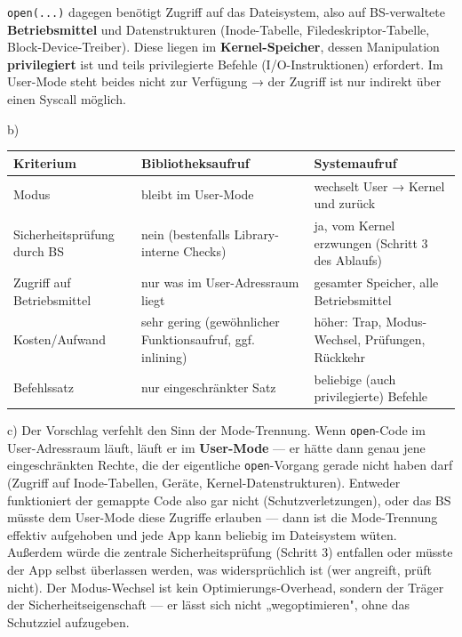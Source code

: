 \documentclass[11pt, a4paper]{article}
\begin{document}
\texttt{open(...)} dagegen benötigt Zugriff auf das Dateisystem, also auf BS-verwaltete \textbf{Betriebsmittel} und Datenstrukturen (Inode-Tabelle, Filedeskriptor-Tabelle, Block-Device-Treiber). Diese liegen im \textbf{Kernel-Speicher}, dessen Manipulation \textbf{privilegiert} ist und teils privilegierte Befehle (I/O-Instruktionen) erfordert. Im User-Mode steht beides nicht zur Verfügung → der Zugriff ist nur indirekt über einen Syscall möglich.


b)



{\small
\begin{tabularx}{\linewidth}{XXX}
\hline
\rowcolor{tableheadbg}
{\color{white}\textbf{Kriterium}} & {\color{white}\textbf{Bibliotheksaufruf}} & {\color{white}\textbf{Systemaufruf}} \\[2pt]
\hline
\endhead
\hline
\endfoot
Modus & bleibt im User-Mode & wechselt User → Kernel und zurück \\
Sicherheitsprüfung durch BS & nein (bestenfalls Library-interne Checks) & ja, vom Kernel erzwungen (Schritt 3 des Ablaufs) \\
Zugriff auf Betriebsmittel & nur was im User-Adressraum liegt & gesamter Speicher, alle Betriebsmittel \\
Kosten/Aufwand & sehr gering (gewöhnlicher Funktionsaufruf, ggf. inlining) & höher: Trap, Modus-Wechsel, Prüfungen, Rückkehr \\
Befehlssatz & nur eingeschränkter Satz & beliebige (auch privilegierte) Befehle \\
\end{tabularx}
}


c) Der Vorschlag verfehlt den Sinn der Mode-Trennung. Wenn \texttt{open}-Code im User-Adressraum läuft, läuft er im \textbf{User-Mode} — er hätte dann genau jene eingeschränkten Rechte, die der eigentliche \texttt{open}-Vorgang gerade nicht haben darf (Zugriff auf Inode-Tabellen, Geräte, Kernel-Datenstrukturen). Entweder funktioniert der gemappte Code also gar nicht (Schutzverletzungen), oder das BS müsste dem User-Mode diese Zugriffe erlauben — dann ist die Mode-Trennung effektiv aufgehoben und jede App kann beliebig im Dateisystem wüten. Außerdem würde die zentrale Sicherheitsprüfung (Schritt 3) entfallen oder müsste der App selbst überlassen werden, was widersprüchlich ist (wer angreift, prüft nicht). Der Modus-Wechsel ist kein Optimierungs-Overhead, sondern der Träger der Sicherheitseigenschaft — er lässt sich nicht „wegoptimieren", ohne das Schutzziel aufzugeben.





\end{document}
